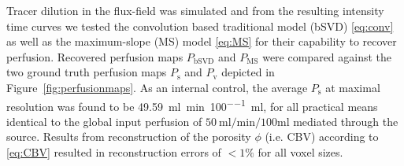 \documentclass[aps,prb,article,groupedaddress,showkeys]{revtex4}
\begin{document}
	
	Tracer dilution in the flux-field was simulated and from the resulting intensity time curves we tested the convolution based traditional model (bSVD) \eqref{eq:conv} as well as the maximum-slope (MS) model \eqref{eq:MS} for their capability to recover perfusion. Recovered perfusion maps $P_{\mathrm{bSVD}}$ and $P_{\mathrm{MS}}$ were compared against the two ground truth perfusion maps $P_{\mathrm{s}}$ and $P_{\mathrm{v}}$ depicted in Figure~\ref{fig:perfusionmaps}. As an internal control, the average $P_{\mathrm{s}}$ at maximal resolution was found to be \SI{49.59}{\milli\litre\per\minute\per100\milli\litre}, for all practical means identical to the global input perfusion of $\SI{50}{\milli\litre\per\minute\per100\milli\litre}$ mediated through the source.	Results from reconstruction of the porosity $\phi$ (i.e. CBV) according to \eqref{eq:CBV} resulted in reconstruction errors of $<1\%$ for all voxel sizes. 
	
\end{document}
